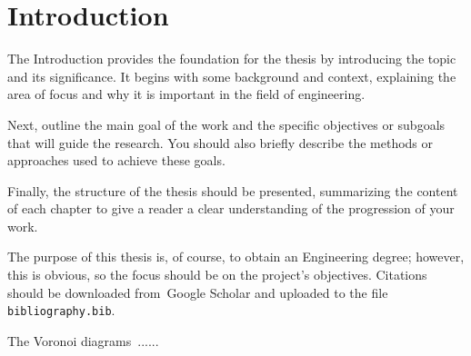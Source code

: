 \chapter{Introduction}

The Introduction provides the foundation for the thesis by introducing the topic and its significance. It begins with some background and context, explaining the area of focus and why it is important in the field of engineering. 

Next, outline the main goal of the work and the specific objectives or subgoals that will guide the research. You should also briefly describe the methods or approaches used to achieve these goals.

Finally, the structure of the thesis should be presented, summarizing the content of each chapter to give a reader a clear understanding of the progression of your work.

The purpose of this thesis is, of course, to obtain an Engineering degree; however, this is obvious, so the focus should be on the project's objectives. Citations should be downloaded from~Google Scholar and uploaded to the file \texttt{bibliography.bib}.

The Voronoi diagrams~\cite{aurenhammer1991voronoi}......


